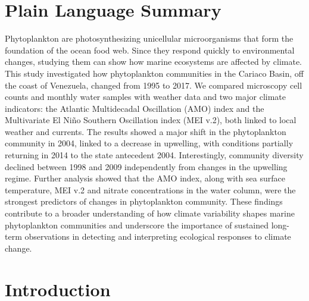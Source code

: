 \documentclass[draft]{agujournal2019}
\begin{document}
\section*{Plain Language Summary}

Phytoplankton are photosynthesizing unicellular microorganisms that form the foundation of the ocean food web. Since they respond quickly to environmental changes, studying them can show how marine ecosystems are affected by climate.
This study investigated how phytoplankton communities in the Cariaco Basin, off the coast of Venezuela, changed from 1995 to 2017. We compared microscopy cell counts and monthly water samples with weather data and two major climate indicators: the Atlantic Multidecadal Oscillation (AMO) index and the Multivariate El Niño Southern Oscillation index (MEI v.2), both linked to local weather and currents.
The results showed a major shift in the phytoplankton community in 2004, linked to a decrease in upwelling, with conditions partially returning in 2014 to the state antecedent 2004. Interestingly, community diversity declined between 1998 and 2009 independently from changes in the upwelling regime. Further analysis showed that the AMO index, along with sea surface temperature, MEI v.2 and nitrate concentrations in the water column, were the strongest predictors of changes in phytoplankton community.
These findings contribute to a broader understanding of how climate variability shapes marine phytoplankton communities and underscore the importance of sustained long-term observations in detecting and interpreting ecological responses to climate change.








\section{Introduction}
%
\end{document}
